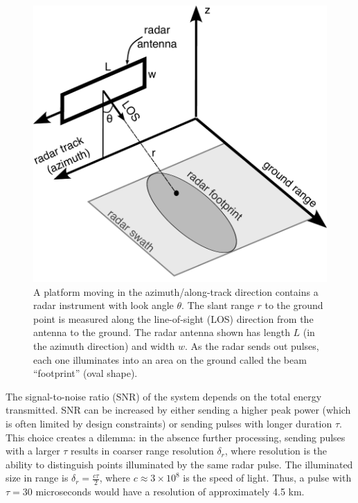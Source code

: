 \begin{figure}
	\centering
		\includegraphics[width=0.99\linewidth]{figures/chapter2-sar/sar-geometry.pdf}
	\caption[Acquisition geometry of a SAR platform]{
	A platform moving in the azimuth/along-track direction contains a radar instrument with look angle $\theta$.    The slant range $r$ to the ground point is measured along the line-of-sight (LOS) direction from the antenna to the ground.
   	The radar antenna shown has length $L$ (in the azimuth direction) and width $w$.
   	As the radar sends out pulses, each one illuminates into an area on the ground called the beam ``footprint'' (oval shape). 
	}
	\label{fig:ch2-sar-geometry}
\end{figure}



The signal-to-noise ratio (SNR) of the system depends on the total energy transmitted.  SNR can be increased by either sending a higher peak power (which is often limited by design constraints) or sending pulses with longer duration $\tau$. This choice creates a dilemma: in the absence further processing, sending pulses with a larger $\tau$ results in coarser range resolution $\delta_r$, where resolution is the ability to distinguish points illuminated by the same radar pulse. The illuminated size in range is $\delta_r = \frac{c \tau}{2}$, where $c \approx 3 \times 10^8$ is the speed of light. Thus, a pulse with $\tau = 30 $ microseconds would have a resolution of approximately 4.5 km. 

